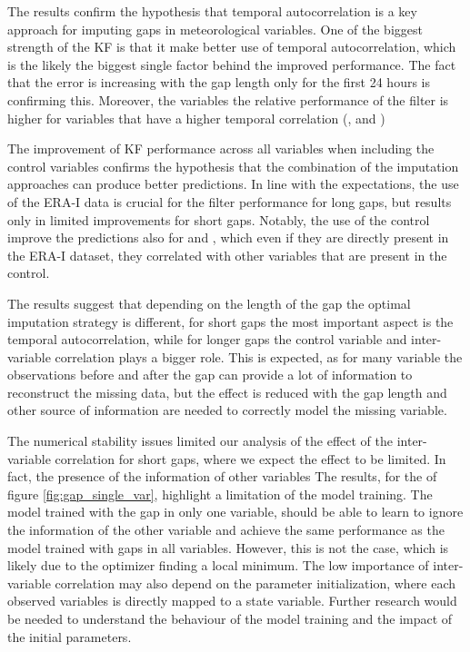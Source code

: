 \documentclass{article}
\begin{document}
The results confirm the hypothesis that temporal autocorrelation is a key approach for imputing gaps in meteorological variables. One of the biggest strength of the KF is that it make better use of temporal autocorrelation, which is the likely the biggest single factor behind the improved performance. The fact that the error is increasing with the gap length only for the first 24 hours is confirming this. Moreover, the variables the relative performance of the filter is higher for variables that have a higher temporal correlation (,  and )

The improvement of KF performance across all variables when including the control variables confirms the hypothesis that the combination of the imputation approaches can produce better predictions. In line with the expectations, the use of the ERA-I data is crucial for the filter performance for long gaps, but results only in limited improvements for short gaps. Notably, the use of the control improve the predictions also for  and , which even if they are directly present in the ERA-I dataset, they correlated with other variables that are present in the control.

The results suggest that depending on the length of the gap the optimal imputation strategy is different, for short gaps the most important aspect is the temporal autocorrelation, while for longer gaps the control variable and inter-variable correlation plays a bigger role. This is expected, as for many variable the observations before and after the gap can provide a lot of information to reconstruct the missing data, but the effect is reduced with the gap length and other source of information are needed to correctly model the missing variable.

The numerical stability issues limited our analysis of the effect of the inter-variable correlation for short gaps, where we expect the effect to be limited. In fact, the presence of the information of other variables
The results, for the of figure \ref{fig:gap_single_var}, highlight a limitation of the model training. The model trained with the gap in  only one variable, should be able to learn to ignore the information of the other variable and achieve the same performance as the model trained with gaps in all variables. However, this is not the case, which is likely due to the optimizer finding a local minimum.
The low importance of inter-variable correlation may also depend on the parameter initialization, where each observed variables is directly mapped to a state variable.
Further research would be needed to understand the behaviour of the model training and the impact of the initial parameters.
\end{document}
